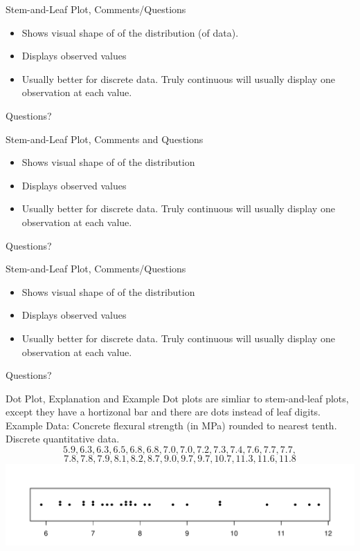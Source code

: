 \documentclass{beamer}
\newcommand{\qtns}[0]{\begin{center} Questions? \end{center}}
\newcommand{\nl}[1]{\vspace{#1 em}}
\begin{document}
\begin{frame}{Stem-and-Leaf Plot, Comments/Questions}
    \begin{itemize}
        \item Shows visual shape of of the distribution (of data).
        \item Displays observed values
        \item Usually better for discrete data. Truly continuous will usually display one observation at each value.
    \end{itemize}
    \qtns
\end{frame}

\begin{frame}{Stem-and-Leaf Plot, Comments and Questions}
    \begin{itemize}
        \item Shows visual shape of of the distribution
        \item Displays observed values
        \item Usually better for discrete data. Truly continuous will usually display one observation at each value.
    \end{itemize}
    \qtns
\end{frame}

\begin{frame}{Stem-and-Leaf Plot, Comments/Questions}
    \begin{itemize}
        \item Shows visual shape of of the distribution
        \item Displays observed values
        \item Usually better for discrete data. Truly continuous will usually display one observation at each value.
    \end{itemize}
    \qtns
\end{frame}

\begin{frame}{Dot Plot, Explanation and Example}
    Dot plots are simliar to stem-and-leaf plots, except they have a hortizonal bar and there are dots instead of leaf digits.\\
    \nl{0.5}
    Example Data: Concrete flexural strength (in MPa) rounded to nearest tenth. Discrete quantitative data.
    \[5.9,6.3,6.3,6.5,6.8,6.8,7.0,7.0,7.2,7.3,7.4,7.6,7.7,7.7,\]
    \[7.8,7.8,7.9,8.1,8.2,8.7,9.0,9.7,9.7,10.7,11.3,11.6,11.8\]
    \includegraphics[scale=.5]{ch01_strength_dot_stack.pdf}
\end{frame}
\end{document}

